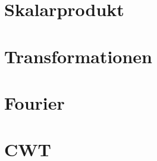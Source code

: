 %
%
%

\begin{frame}
\titlepage
\end{frame}



\section{Skalarprodukt}


\section{Transformationen}


\section{Fourier}


\section{CWT}






